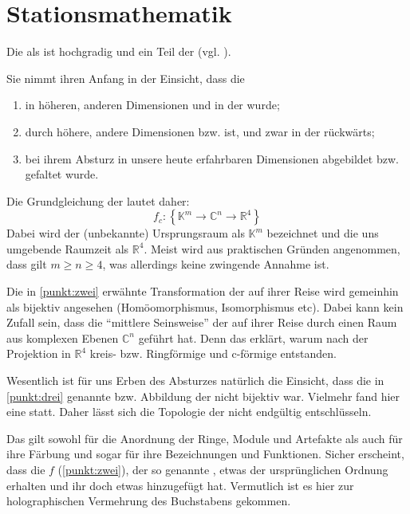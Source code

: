 \section{Stationsmathematik}\label{sec:mathematik}

Die  als  ist hochgradig  und ein Teil der  (vgl. \cite[Kap. 4]{adams_life}). 

Sie nimmt ihren Anfang in der Einsicht, dass die  
\begin{enumerate}
    \item in höheren, anderen Dimensionen und in der  wurde; \label{punkt:eins}
    \item durch höhere, andere Dimensionen  bzw.  ist,\label{punkt:zwei} und zwar in der  rückwärts;
    \item bei ihrem Absturz in unsere heute erfahrbaren Dimensionen abgebildet bzw. gefaltet wurde.\label{punkt:drei}
\end{enumerate}
Die Grundgleichung der  lautet daher:
\begin{equation}
    f_c:\left\{\mathbb{K}^m  \rightarrow \mathbb{C}^n \rightarrow \mathbb{R}^{4}\right\}
\end{equation}
Dabei wird der (unbekannte) Ursprungsraum als $\mathbb{K}^m$ bezeichnet und die uns umgebende Raumzeit als $\mathbb{R}^{4}$. Meist wird aus praktischen Gründen angenommen, dass gilt $m\geq n \geq4$, was allerdings keine zwingende Annahme ist.

Die in   \cref{punkt:zwei} erwähnte Transformation der  auf ihrer Reise wird gemeinhin als bijektiv angesehen (Homöomorphismus, Isomorphismus etc). Dabei kann kein Zufall sein, dass die "`mittlere Seinsweise"' der  auf ihrer Reise durch einen Raum aus komplexen Ebenen  $\mathbb{C}^n$  geführt hat. Denn das erklärt, warum nach der Projektion in $\mathbb{R}^4$ kreis- bzw. Ringförmige und c-förmige  entstanden.

Wesentlich ist für uns Erben des Absturzes natürlich die Einsicht, dass die in  \cref{punkt:drei} genannte  bzw. Abbildung der  nicht bijektiv war. Vielmehr fand hier eine  statt. 
Daher lässt sich die Topologie der  nicht endgültig entschlüsseln. 

Das gilt sowohl für die Anordnung der Ringe, Module und Artefakte als auch für ihre Färbung und sogar für ihre Bezeichnungen und Funktionen. Sicher erscheint, dass die   $f$ (\cref{punkt:zwei}), der so genannte , etwas der ursprünglichen Ordnung erhalten und ihr doch etwas hinzugefügt hat. Vermutlich ist es hier zur holographischen Vermehrung des Buchstabens  gekommen.


